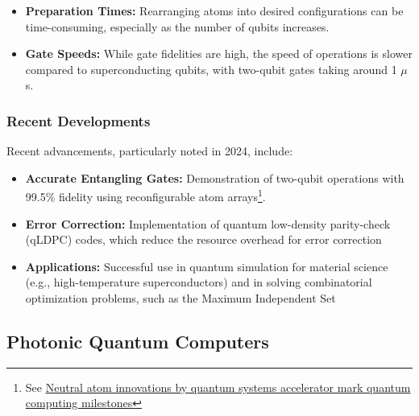 \begin{itemize}
  \item \textbf{Preparation Times:} Rearranging atoms into desired
    configurations can be time-consuming, especially as the number of qubits
    increases.
  \item \textbf{Gate Speeds:} While gate fidelities are high, the speed of
    operations is slower compared to superconducting qubits, with two-qubit
    gates taking around 1 $\mu$s.
\end{itemize}

\subsubsection*{Recent Developments}

Recent advancements, particularly noted in 2024, include:

\begin{itemize}
  \item \textbf{Accurate Entangling Gates:} Demonstration of two-qubit
    operations with 99.5\% fidelity using reconfigurable atom arrays\footnote{
      See \href{https://phys.org/news/2024-09-neutral-atom-quantum-milestones.html}{
        Neutral atom innovations by quantum systems accelerator mark quantum
    computing milestones}}.

  \item \textbf{Error Correction:} Implementation of quantum low-density
    parity-check (qLDPC) codes, which reduce the resource overhead for error
    correction

  \item \textbf{Applications:} Successful use in quantum simulation for
    material science (e.g., high-temperature superconductors) and in solving
    combinatorial optimization problems, such as the Maximum Independent Set
\end{itemize}


\subsection*{Photonic Quantum Computers}

